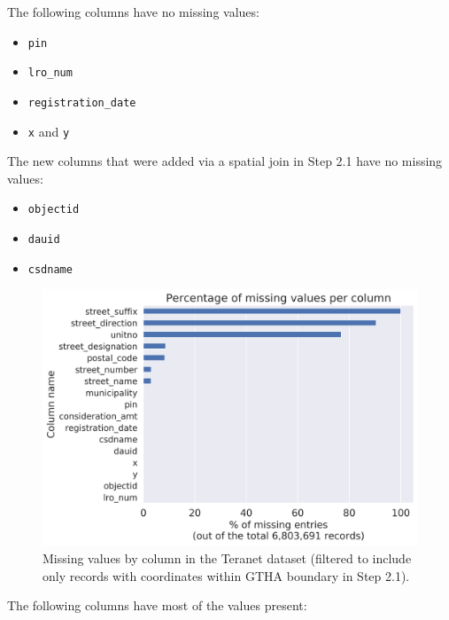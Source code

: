 \documentclass[11pt]{article}
\begin{document}
    \vspace{5mm}

    The following columns have no missing values:

    \begin{itemize}
        \item \texttt{pin}
        \item \texttt{lro\_num}
        \item \texttt{registration\_date}
        \item \texttt{x} and \texttt{y}
    \end{itemize}

    \vspace{5mm}

    The new columns that were added via a spatial join in Step 2.1 have no missing values:

    \begin{itemize}
        \item \texttt{objectid}
        \item \texttt{dauid}
        \item \texttt{csdname}
    \end{itemize}
    \begin{figure}[hbt!]
        \centering
        \includegraphics[width=1\linewidth,trim=1 1 1 1,clip]{img/teranet_na_perc.png}
        \caption{Missing values by column in the Teranet dataset (filtered to include only records with coordinates within GTHA boundary in Step 2.1).}
        \label{fig:teranet_na_counts}
    \end{figure}

    \newpage

    The following columns have most of the values present:
\end{document}
